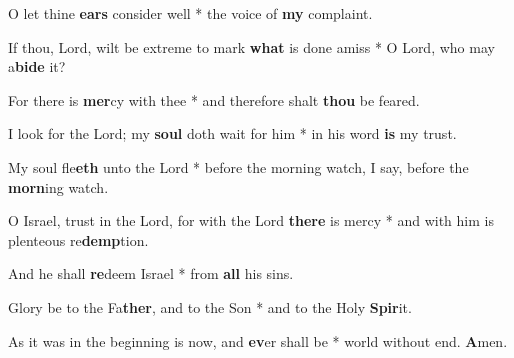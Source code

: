 \begin{multicols}{2}
	O let thine \textbf{ears} consider well * the voice of \textbf{my} complaint.
	
	If thou, Lord, wilt be extreme to mark \textbf{what} is done amiss * O Lord, who may a\textbf{bide} it?
	
	For there is \textbf{mer}cy with thee * and therefore shalt \textbf{thou} be feared.
	
	I look for the Lord; my \textbf{soul} doth wait for him * in his word \textbf{is} my trust.
	
	My soul fle\textbf{eth} unto the Lord * before the morning watch, I say, before the \textbf{morn}ing watch.
	
	O Israel, trust in the Lord, for with the Lord \textbf{there} is mercy * and with him is plenteous re\textbf{demp}tion.
	
	And he shall \textbf{re}deem Israel * from \textbf{all} his sins.
	
	Glory be to the Fa\textbf{ther}, and to the Son * and to the Holy \textbf{Spir}it.
	
	As it was in the beginning is now, and \textbf{ev}er shall be * world without end. \textbf{A}men.
\end{multicols}